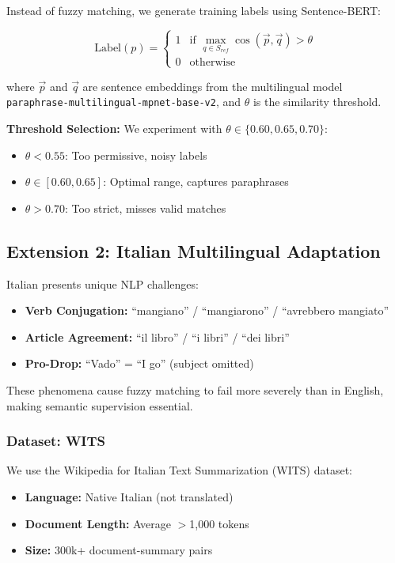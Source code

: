 \documentclass[conference]{IEEEtran}
\begin{document}
Instead of fuzzy matching, we generate training labels using Sentence-BERT:

\begin{equation}
\text{Label}(p) = 
\begin{cases}
1 & \text{if } \max_{q \in S_{ref}} \cos(\vec{p}, \vec{q}) > \theta \\
0 & \text{otherwise}
\end{cases}
\label{eq:semantic}
\end{equation}

where $\vec{p}$ and $\vec{q}$ are sentence embeddings from the multilingual model \texttt{paraphrase-multilingual-mpnet-base-v2}, and $\theta$ is the similarity threshold.

\textbf{Threshold Selection:} We experiment with $\theta \in \{0.60, 0.65, 0.70\}$:
\begin{itemize}
    \item $\theta < 0.55$: Too permissive, noisy labels
    \item $\theta \in [0.60, 0.65]$: Optimal range, captures paraphrases
    \item $\theta > 0.70$: Too strict, misses valid matches
\end{itemize}

\subsection{Extension 2: Italian Multilingual Adaptation}
\label{sec:italian}

Italian presents unique NLP challenges:
\begin{itemize}
    \item \textbf{Verb Conjugation:} ``mangiano'' / ``mangiarono'' / ``avrebbero mangiato''
    \item \textbf{Article Agreement:} ``il libro'' / ``i libri'' / ``dei libri''
    \item \textbf{Pro-Drop:} ``Vado'' = ``I go'' (subject omitted)
\end{itemize}

These phenomena cause fuzzy matching to fail more severely than in English, making semantic supervision essential.

\subsubsection{Dataset: WITS}
We use the Wikipedia for Italian Text Summarization (WITS) dataset:
\begin{itemize}
    \item \textbf{Language:} Native Italian (not translated)
    \item \textbf{Document Length:} Average $>$1,000 tokens
    \item \textbf{Size:} 300k+ document-summary pairs
\end{itemize}
\end{document}
